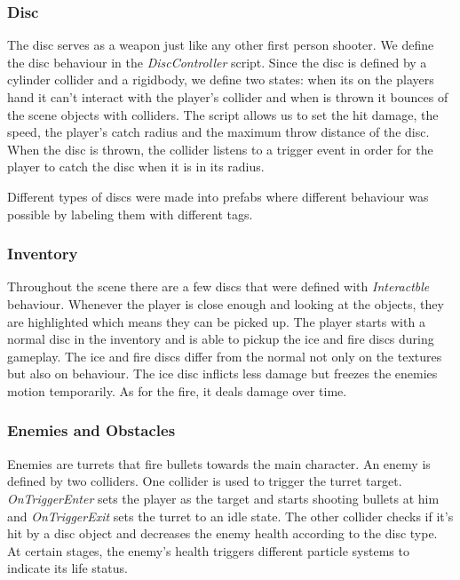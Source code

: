 \documentclass[a4paper]{article}
\begin{document}
     \subsubsection{Disc}
	The disc serves as a weapon just like any other first person shooter. We define the disc behaviour in the \textit{DiscController} script. Since the disc is defined by a cylinder collider and a rigidbody, we define two states: when its on the players hand it can't interact with the player's collider and when is thrown it bounces of the scene objects with colliders. The script allows us to set the hit damage, the speed, the player's catch radius and the maximum throw distance of the disc. When the disc is thrown, the collider listens to a  trigger event in order for the player to catch the disc when it is in its radius.
    
    Different types of discs were made into prefabs where different behaviour was possible by labeling them with different tags.
    
	\subsubsection{Inventory}
     Throughout the scene there are a few discs that were defined with \textit{Interactble} behaviour. Whenever the player is close enough and looking at the objects, they are highlighted which means they can be picked up. The player starts with a normal disc in the inventory and is able to pickup the ice and fire discs during gameplay. The ice and fire discs differ from the normal not only on the textures but also on behaviour. The ice disc inflicts less damage but freezes the enemies motion temporarily. As for the fire, it deals damage over time.
          
    \subsubsection{Enemies and Obstacles}
    
     Enemies are turrets that fire bullets towards the main character. An enemy is defined by two colliders. One collider is used to trigger the turret target. \textit{OnTriggerEnter} sets the player as the target and starts shooting bullets at him and \textit{OnTriggerExit} sets the turret to an idle state. The other collider checks if it's hit by a disc object and decreases the enemy health according to the disc type. At certain stages, the enemy's health triggers different particle systems to indicate its life status.
     
\end{document}
